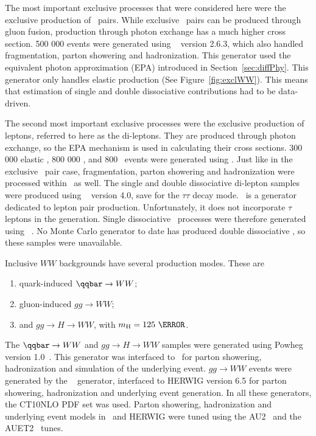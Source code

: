 \par The most important exclusive processes that were considered here were the exclusive production 
of \Wpm\ pairs. While exclusive \Wpm\ pairs can be produced through gluon fusion, production through 
photon exchange has a much higher cross section. 500 000 events were generated using \HERWIGPP~\cite{Hpp} 
version 2.6.3, which also handled fragmentation, parton showering and hadronization. This generator 
used the equivalent photon approximation (EPA) introduced in 
Section~\ref{sec:diffPhy}. This generator only handles elastic production (See Figure~\ref{fig:exclWW}). 
This means that estimation of single and double dissociative contributions had to be 
data-driven. 

\par The second most important exclusive processes were the exclusive production of leptons, 
referred to here as the di-leptons. They are produced through photon exchange, so 
the EPA mechanism is used in calculating their 
cross sections. 300 000 elastic \yytautau, 800 000 \yymumu, and 800 \yyee\ events were generated using 
\HERWIGPP.  Just like in the exclusive \Wpm\ pair case, fragmentation, parton showering and hadronization 
were processed within \HERWIGPP\ as well. The single and double dissociative di-lepton samples were 
produced using \LPAIR~\cite{Vermaseren} version 4.0, save for the $\tau\tau$ decay mode. 
\LPAIR\ is a generator dedicated to lepton pair production. Unfortunately, it does not incorporate 
$\tau$ leptons in the generation. Single dissociative \yytautau\ processes were 
therefore generated using ~\cite{Pythia8}. No Monte Carlo generator 
to date has produced double dissociative \yytautau, so these samples were unavailable.
     
\par Inclusive $WW$ backgrounds have several production modes. These are 
\begin{enumerate}
\item quark-induced $\qqbar\to WW$;
\item gluon-induced $gg\to WW$;
\item and $gg\to H\to WW$, with $m_{\text{H}}=125~\GeV$. 
\end{enumerate} 
The $\qqbar\to WW$ and $gg\to H\to WW$ samples were generated using Powheg 
version 1.0~\cite{Powheg1}. This generator was interfaced to \ for parton showering, 
hadronization and simulation of the underlying event. $gg\to WW$ events were generated by 
the \ggww~\cite{gg2WW} generator, interfaced to HERWIG version 6.5 for parton showering, hadronization 
and underlying event generation. In all these generators, the CT10NLO PDF set was used. 
Parton showering, hadronization and underlying event models in \ and HERWIG were 
tuned using the AU2~\cite{ATLAS:Pythia8Tune} and the AUET2~\cite{ATLAS:2011Tune} tunes.  
 
